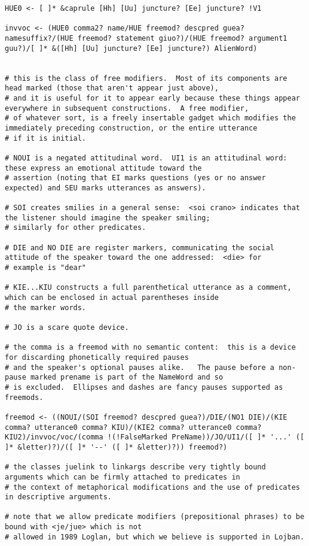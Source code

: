\documentclass{article}
\begin{document}
\begin{verbatim}
HUE0 <- [ ]* &caprule [Hh] [Uu] juncture? [Ee] juncture? !V1

invvoc <- (HUE0 comma2? name/HUE freemod? descpred guea? namesuffix?/(HUE freemod? statement giuo?)/(HUE freemod? argument1 guu?)/[ ]* &([Hh] [Uu] juncture? [Ee] juncture?) AlienWord)


# this is the class of free modifiers.  Most of its components are head marked (those that aren't appear just above),
# and it is useful for it to appear early because these things appear everywhere in subsequent constructions.  A free modifier,
# of whatever sort, is a freely insertable gadget which modifies the immediately preceding construction, or the entire utterance
# if it is initial.

# NOUI is a negated attitudinal word.  UI1 is an attitudinal word:  these express an emotional attitude toward the 
# assertion (noting that EI marks questions (yes or no answer expected) and SEU marks utterances as answers).

# SOI creates smilies in a general sense:  <soi crano> indicates that the listener should imagine the speaker smiling;
# similarly for other predicates.

# DIE and NO DIE are register markers, communicating the social attitude of the speaker toward the one addressed:  <die> for
# example is "dear"

# KIE...KIU constructs a full parenthetical utterance as a comment, which can be enclosed in actual parentheses inside
# the marker words.

# JO is a scare quote device.

# the comma is a freemod with no semantic content:  this is a device for discarding phonetically required pauses
# and the speaker's optional pauses alike.   The pause before a non-pause marked prename is part of the NameWord and so
# is excluded.  Ellipses and dashes are fancy pauses supported as freemods.

freemod <- ((NOUI/(SOI freemod? descpred guea?)/DIE/(NO1 DIE)/(KIE comma? utterance0 comma? KIU)/(KIE2 comma? utterance0 comma? KIU2)/invvoc/voc/(comma !(!FalseMarked PreName))/JO/UI1/([ ]* '...' ([ ]* &letter)?)/([ ]* '--' ([ ]* &letter)?)) freemod?)

# the classes juelink to linkargs describe very tightly bound arguments which can be firmly attached to predicates in 
# the context of metaphorical modifications and the use of predicates in descriptive arguments.

# note that we allow predicate modifiers (prepositional phrases) to be bound with <je/jue> which is not
# allowed in 1989 Loglan, but which we believe is supported in Lojban.


\end{verbatim}
\end{document}
